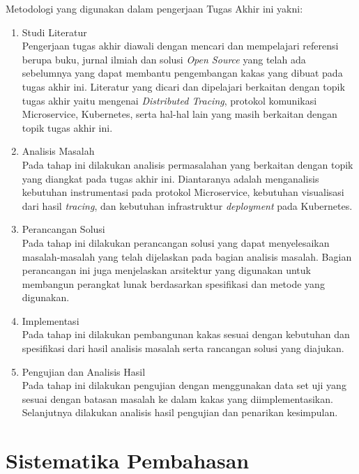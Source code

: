 Metodologi yang digunakan dalam pengerjaan Tugas Akhir ini yakni:
\begin{enumerate}
    \item Studi Literatur \\
          Pengerjaan tugas akhir diawali dengan mencari dan mempelajari referensi berupa buku, jurnal ilmiah dan solusi \textit{Open Source}  yang telah ada sebelumnya yang dapat membantu pengembangan kakas yang dibuat pada tugas akhir ini. Literatur yang dicari dan dipelajari berkaitan dengan topik tugas akhir yaitu mengenai \textit{Distributed Tracing},  protokol komunikasi Microservice, Kubernetes, serta hal-hal lain yang masih berkaitan dengan topik tugas akhir ini.

    \item Analisis Masalah \\
          Pada tahap ini dilakukan analisis permasalahan yang berkaitan dengan topik yang diangkat pada tugas akhir ini. Diantaranya adalah menganalisis kebutuhan instrumentasi pada protokol Microservice, kebutuhan visualisasi dari hasil \textit{tracing}, dan kebutuhan infrastruktur \textit{deployment} pada Kubernetes.

    \item Perancangan Solusi \\
          Pada tahap ini dilakukan perancangan solusi yang dapat menyelesaikan masalah-masalah yang telah dijelaskan pada bagian analisis masalah. Bagian perancangan ini juga menjelaskan arsitektur yang digunakan untuk membangun perangkat lunak berdasarkan spesifikasi dan metode yang digunakan.

    \item Implementasi \\
          Pada tahap ini dilakukan pembangunan kakas sesuai dengan kebutuhan dan spesifikasi dari hasil analisis masalah serta rancangan solusi yang diajukan.

    \item Pengujian dan Analisis Hasil \\
          Pada tahap ini dilakukan pengujian dengan menggunakan data set uji yang sesuai dengan batasan masalah ke dalam kakas yang diimplementasikan. Selanjutnya dilakukan analisis hasil pengujian dan penarikan kesimpulan.

\end{enumerate}

\section{Sistematika Pembahasan}

